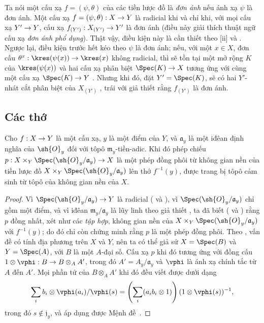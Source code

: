 \documentclass[oneside]{amsart}
\makeatletter
\newcommand{\ega@arrow}[2]{\mathchoice{#1}{#2}{#2}{#2}}
\renewcommand{\to}{\ega@arrow{\longrightarrow}{\rightarrow}}
\let\EGAOriginalLabel\label
\renewcommand{\label}[1]{\phantomsection\EGAOriginalLabel{#1}}
\makeatother
\begin{document}
\begin{remark}[3.5.11]
\label{I.3.5.11}
Ta nói một cấu xạ $f=(\psi,\theta)$ của các tiền lược đồ là
\emph{đơn ánh} nếu ánh xạ $\psi$ là đơn ánh.
Một cấu xạ $f=(\psi,\theta):X\to Y$ là radicial khi và chỉ khi, với mọi cấu
xạ $Y'\to Y$, cấu xạ $f_{(Y')}:X_{(Y')}\to Y'$ là đơn ánh (điều này giải
thích thuật ngữ cấu xạ \emph{đơn ánh phổ dụng}).
Thật vậy, điều kiện này là cần thiết theo
[ii] và .
Ngược lại, điều kiện trước hết kéo theo $\psi$ là đơn ánh; nếu, với một
$x\in X$, đơn cấu $\theta^x:\kres(\psi(x))\to\kres(x)$ không radicial, thì
sẽ tồn tại một mở rộng $K$ của $\kres(\psi(x))$ và hai cấu xạ phân biệt
$\Spec(K)\to X$ tương ứng với cùng một cấu xạ $\Spec(K)\to Y$
.
Nhưng khi đó, đặt $Y'=\Spec(K)$, sẽ có hai $Y'$-nhát cắt phân biệt của
$X_{(Y')}$ , trái với giả thiết rằng $f_{(Y')}$ là đơn ánh.
\end{remark}

\subsection{Các thớ}
\label{subsection:I.3.6}

\begin{proposition}[3.6.1]
\label{I.3.6.1}
Cho $f:X\to Y$ là một cấu xạ, $y$ là một điểm của $Y$, và $\mathfrak{a}_y$ là một iđêan định nghĩa của $\sh{O}_y$ đối với tôpô $\mathfrak{m}_y$-tiền-adic.
Khi đó phép chiếu $p:X\times_Y\Spec(\sh{O}_y/\mathfrak{a}_y)\to X$ là một phép đồng phôi từ không gian nền của tiền lược đồ $X\times_Y\Spec(\sh{O}_y/\mathfrak{a}_y)$ lên thớ $f^{-1}(y)$, được trang bị tôpô cảm sinh từ tôpô của không gian nền của $X$.
\end{proposition}

\begin{proof}
Vì $\Spec(\sh{O}_y/\mathfrak{a}_y)\to Y$ là radicial ( và ), vì $\Spec(\sh{O}_y/\mathfrak{a}_y)$ chỉ gồm một điểm, và vì iđêan $\mathfrak{m}_y/\mathfrak{a}_y$ là lũy linh theo giả thiết , ta đã biết ( và ) rằng $p$ đồng nhất, xét như các \emph{tập hợp}, không gian nền của $X\times_Y\Spec(\sh{O}_y/\mathfrak{a}_y)$ với $f^{-1}(y)$; do đó chỉ còn chứng minh rằng $p$ là một phép đồng phôi.
Theo , vấn đề có tính địa phương trên $X$ và $Y$, nên ta có thể giả sử $X=\Spec(B)$ và $Y=\Spec(A)$, với $B$ là một $A$-đại số.
Cấu xạ $p$ khi đó tương ứng với đồng cấu $1\otimes\vphi:B\to B\otimes_A A'$, trong đó $A'=A_y/\mathfrak{a}_y$ và $\vphi$ là ánh xạ chính tắc từ $A$ đến $A'$.
Mọi phần tử của $B\otimes_A A'$ khi đó đều viết được dưới dạng
\[
  \sum_i b_i\otimes\vphi(a_i)/\vphi(s)=\left(\sum_i(a_ib_i\otimes1)\right)(1\otimes\vphi(s))^{-1},
\]
trong đó $s\not\in\mathfrak{j}_y$, và áp dụng được Mệnh đề~.
\end{proof}
\end{document}
